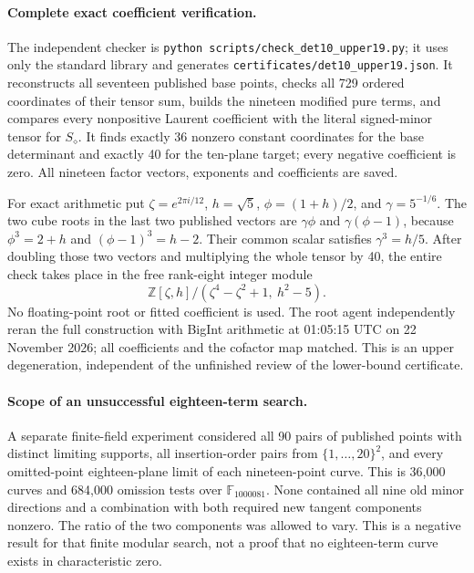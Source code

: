 \paragraph{Complete exact coefficient verification.}
The independent checker is
\texttt{python scripts/check\_det10\_upper19.py}; it uses only the standard
library and generates \texttt{certificates/det10\_upper19.json}.
It reconstructs all seventeen published base points, checks all 729
ordered coordinates of their tensor sum, builds the nineteen modified
pure terms, and compares every nonpositive Laurent coefficient with the
literal signed-minor tensor for $S_\diamond$.  It finds exactly 36
nonzero constant coordinates for the base determinant and exactly 40
for the ten-plane target; every negative coefficient is zero.
All nineteen factor vectors, exponents and coefficients are saved.

For exact arithmetic put $\zeta=e^{2\pi i/12}$, $h=\sqrt5$,
$\phi=(1+h)/2$, and $\gamma=5^{-1/6}$.
The two cube roots in the last two published vectors are
$\gamma\phi$ and $\gamma(\phi-1)$, because
$\phi^3=2+h$ and $(\phi-1)^3=h-2$.
Their common scalar satisfies $\gamma^3=h/5$.
After doubling those two vectors and multiplying the whole tensor by 40,
the entire check takes place in the free rank-eight integer module
\[
 \mathbb Z[\zeta,h]/(\zeta^4-\zeta^2+1,\ h^2-5).
\]
No floating-point root or fitted coefficient is used.  The root agent
independently reran the full construction with BigInt arithmetic at
01:05:15 UTC on 22 November 2026; all coefficients and the cofactor map
matched.  This is an upper degeneration, independent of the unfinished
review of the lower-bound certificate.

\paragraph{Scope of an unsuccessful eighteen-term search.}
A separate finite-field experiment considered all 90 pairs of published
points with distinct limiting supports, all insertion-order pairs from
$\{1,\ldots,20\}^2$, and every omitted-point eighteen-plane limit of each
nineteen-point curve.  This is 36,000 curves and 684,000 omission tests
over $\mathbb F_{1000081}$.  None contained all nine old minor directions
and a combination with both required new tangent components nonzero.
The ratio of the two components was allowed to vary.  This is a negative
result for that finite modular search, not a proof that no eighteen-term
curve exists in characteristic zero.
